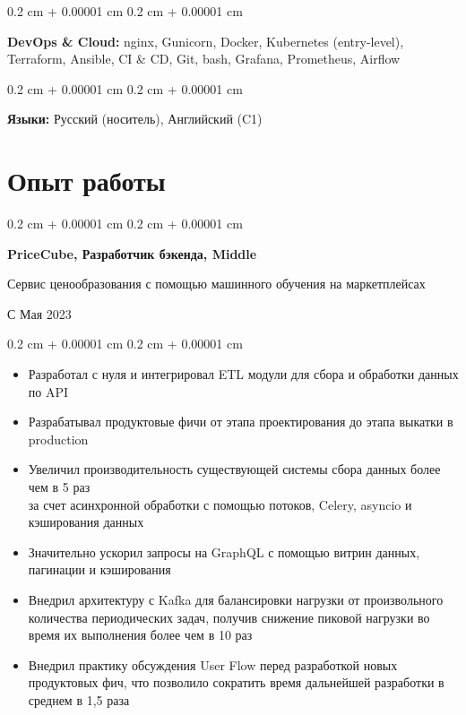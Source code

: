\documentclass[10pt, letterpaper]{article}
\newenvironment{highlights}{
    \begin{itemize}[
        topsep=0.10 cm,
        parsep=0.10 cm,
        partopsep=0pt,
        itemsep=0pt,
        leftmargin=0.4 cm + 10pt
    ]
}{
    \end{itemize}
} %
\newenvironment{onecolentry}{
    \begin{adjustwidth}{
        0.2 cm + 0.00001 cm
    }{
        0.2 cm + 0.00001 cm
    }
}{
    \end{adjustwidth}
} %
\newenvironment{twocolentry}[2][]{
    \onecolentry
    \def\secondColumn{#2}
    \setcolumnwidth{\fill, 5 cm}
    \begin{paracol}{2}
}{
    \switchcolumn \raggedleft \secondColumn
    \end{paracol}
    \endonecolentry
} %
\begin{document}
        \vspace{0.1 cm}

        \begin{onecolentry}
            \textbf{DevOps \& Cloud:}  nginx, Gunicorn, Docker, Kubernetes (entry-level), Terraform, Ansible, CI \& CD, Git, bash, Grafana, Prometheus, Airflow
        \end{onecolentry}

        \vspace{0.1 cm}

        \begin{onecolentry}
            \textbf{Языки:} Русский (носитель), Английский (C1)
        \end{onecolentry}
        

    \section{Опыт работы}

   
        \begin{twocolentry}{        
        {С Мая 2023}}
            \textbf{PriceCube, Разработчик бэкенда, Middle}
            
            {Сервис ценообразования с помощью машинного обучения на маркетплейсах}
        \end{twocolentry}

        \vspace{0.10 cm}
        \begin{onecolentry}
            \begin{highlights}
                \item Разработал с нуля и интегрировал ETL модули для сбора и обработки данных по API
                \item Разрабатывал продуктовые фичи от этапа проектирования до этапа выкатки в production
                \item Увеличил производительность существующей системы сбора данных более чем в 5 раз \\ за счет асинхронной обработки с помощью потоков, Celery, asyncio и кэширования данных
                \item Значительно ускорил запросы на GraphQL с помощью витрин данных, пагинации и кэширования
                \item Внедрил архитектуру с Kafka для балансировки нагрузки от произвольного количества периодических задач, получив снижение пиковой нагрузки во время их выполнения более чем в 10 раз
                \item Внедрил практику обсуждения User Flow перед разработкой новых продуктовых фич, что позволило сократить время дальнейшей разработки в среднем в 1,5 раза
            \end{highlights}
        \end{onecolentry}
\end{document}
